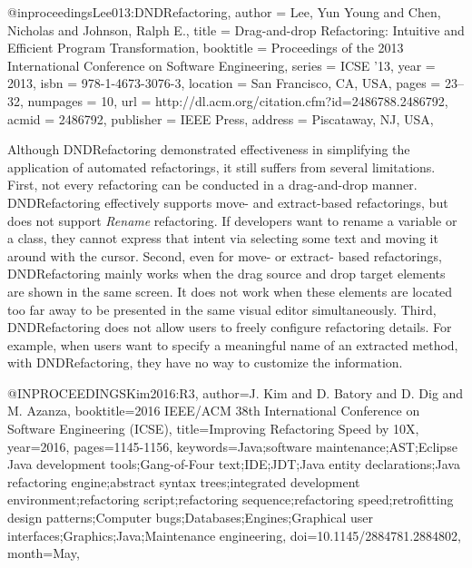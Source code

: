 \documentclass[runningheads,a4paper]{llncs}
\begin{document}
@inproceedings{Lee013:DNDRefactoring, 
 author = {Lee, Yun Young and Chen, Nicholas and Johnson, Ralph E.},
 title = {Drag-and-drop Refactoring: Intuitive and Efficient Program Transformation},
 booktitle = {Proceedings of the 2013 International Conference on Software Engineering},
 series = {ICSE '13},
 year = {2013},
 isbn = {978-1-4673-3076-3},
 location = {San Francisco, CA, USA},
 pages = {23--32},
 numpages = {10},
 url = {http://dl.acm.org/citation.cfm?id=2486788.2486792},
 acmid = {2486792},
 publisher = {IEEE Press},
 address = {Piscataway, NJ, USA},
} 

Although DNDRefactoring demonstrated effectiveness in simplifying the application of automated refactorings, it still suffers from several limitations. First, not every refactoring can be conducted in a drag-and-drop manner. DNDRefactoring effectively supports move- and extract-based refactorings, but does not support \emph{Rename} refactoring. If developers want to rename a variable or a class, they cannot express that intent via selecting some text and moving it around with the cursor. Second, even for move- or extract- based refactorings, DNDRefactoring mainly works when the drag source and drop target elements are shown in the same screen. It does not work when these elements are located too far away to be presented in the same visual editor simultaneously. Third, DNDRefactoring does not allow users to freely configure refactoring details. For example, when users want to specify a meaningful name of an extracted method, with DNDRefactoring, they have no way to customize the information.

@INPROCEEDINGS{Kim2016:R3, 
author={J. Kim and D. Batory and D. Dig and M. Azanza}, 
booktitle={2016 IEEE/ACM 38th International Conference on Software Engineering (ICSE)}, 
title={Improving Refactoring Speed by 10X}, 
year={2016}, 
pages={1145-1156}, 
keywords={Java;software maintenance;AST;Eclipse Java development tools;Gang-of-Four text;IDE;JDT;Java entity declarations;Java refactoring engine;abstract syntax trees;integrated development environment;refactoring script;refactoring sequence;refactoring speed;retrofitting design patterns;Computer bugs;Databases;Engines;Graphical user interfaces;Graphics;Java;Maintenance engineering}, 
doi={10.1145/2884781.2884802}, 
month={May},}
\end{document}
